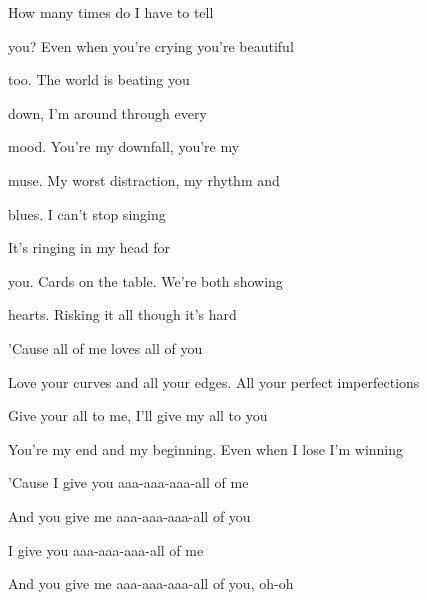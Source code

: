 \begin{song}
\bigskip

 How many times do I have to tell \par
{}you? Even when you're crying you're beautiful \par
{}too. The world is beating you \par
{}down, I'm around through every \par
{}mood. You're my downfall, you're my \par
{}muse. My worst distraction, my rhythm and  \par
{}blues. I can't stop singing \par
It's ringing in my head for \par

\bigskip

you. Cards on the table. We're both showing \par
{}hearts. Risking it all though it's hard \par

\bigskip

'Cause all of me loves all of you \par
Love your curves and all your edges. All your perfect imperfections \par
Give your all to me, I'll give my all to you \par
You're my end and my beginning. Even when I lose I'm winning \par
'Cause I give you aaa-aaa-aaa-all of me   \par
And you give me aaa-aaa-aaa-all of you  \par

\bigskip

I give you aaa-aaa-aaa-all of me   \par
And you give me aaa-aaa-aaa-all of you, oh-oh \par

\end{song}
